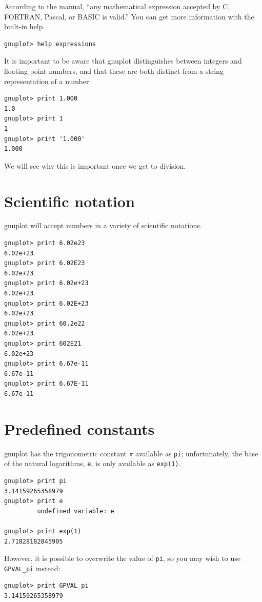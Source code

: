 \documentclass[11pt,letterpaper]{report}
\begin{document}

According to the manual, ``any mathematical expression accepted by C, FORTRAN, Pascal, or BASIC is valid.'' You can get more information with the built-in help.
\begin{lstlisting}
gnuplot> help expressions
\end{lstlisting}
It is important to be aware that gnuplot distinguishes between integers and floating point numbers, and that these are both distinct from a string representation of a number.
\begin{lstlisting}
gnuplot> print 1.000
1.0
gnuplot> print 1
1
gnuplot> print '1.000'
1.000
\end{lstlisting}
We will see why this is important once we get to division.
\section{Scientific notation}
gnuplot will accept numbers in a variety of scientific notations.
\begin{lstlisting}
gnuplot> print 6.02e23
6.02e+23
gnuplot> print 6.02E23
6.02e+23
gnuplot> print 6.02e+23
6.02e+23
gnuplot> print 6.02E+23
6.02e+23
gnuplot> print 60.2e22
6.02e+23
gnuplot> print 602E21
6.02e+23
gnuplot> print 6.67e-11
6.67e-11
gnuplot> print 6.67E-11
6.67e-11
\end{lstlisting}


\section{Predefined constants}

gnuplot has the trigonometric constant $\pi$ available as \verb+pi+; unfortunately, the base of the natural logarithms, \verb+e+, is only available as \verb+exp(1)+.
\begin{lstlisting}
gnuplot> print pi
3.14159265358979
gnuplot> print e
         undefined variable: e

gnuplot> print exp(1)
2.71828182845905
\end{lstlisting}
However, it is possible to overwrite the value of \verb+pi+, so you may wish to use \verb+GPVAL_pi+ instead:
\begin{lstlisting}
gnuplot> print GPVAL_pi
3.14159265358979
\end{lstlisting}
\end{document}
